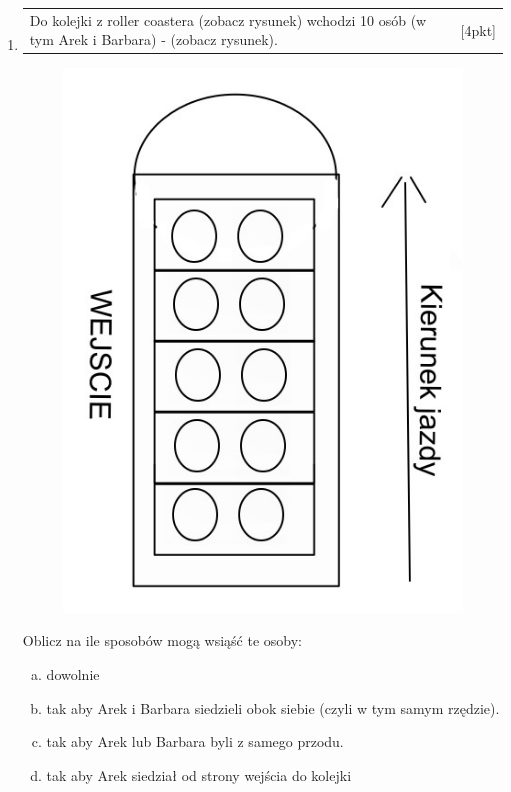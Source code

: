 \documentclass[12pt,a4paper]{article}
\begin{document}
\begin{enumerate}[1.]
		\item  \begin{tabular}{p{13cm} r}
			Do kolejki z roller coastera (zobacz rysunek) wchodzi 10 osób (w tym Arek i Barbara) - (zobacz rysunek). &[4pkt]\\ 
		\end{tabular}
		
		\begin{figure}[h]
			\centering
			\includegraphics[scale=0.4]{rpt2.jpeg}
		\end{figure}
		Oblicz na ile sposobów mogą wsiąść te osoby:
		\begin{enumerate}[a)]
			\item dowolnie
			\item tak aby Arek i Barbara siedzieli obok siebie (czyli w tym samym rzędzie).
			\item tak aby Arek lub Barbara byli z samego przodu.
			\item tak aby Arek siedział od strony wejścia do kolejki
		\end{enumerate}
	

		
		\newpage
		

\end{enumerate}
\end{document}
